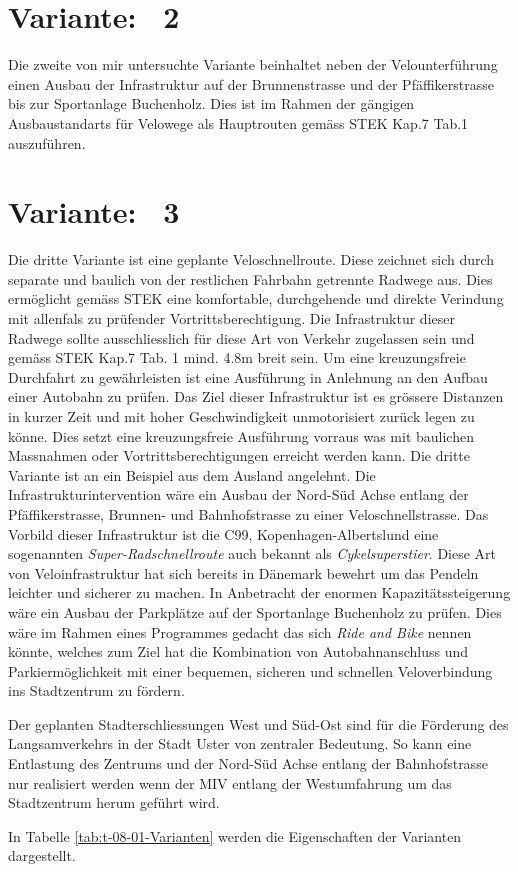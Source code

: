\section{Variante: \ 2}
\label{chap:V2}
	
Die zweite von mir untersuchte Variante beinhaltet neben der Velounterführung einen Ausbau der Infrastruktur auf der Brunnenstrasse und der Pfäffikerstrasse bis zur Sportanlage Buchenholz. Dies ist im Rahmen der gängigen Ausbaustandarts für Velowege als Hauptrouten gemäss STEK Kap.7 Tab.1 auszuführen.

\section{Variante: \ 3}
\label{chap:V3}

Die dritte Variante ist eine geplante Veloschnellroute. 
Diese zeichnet sich durch separate und baulich von der restlichen Fahrbahn getrennte Radwege aus. Dies ermöglicht gemäss STEK eine komfortable, durchgehende und direkte Verindung mit allenfals zu prüfender Vortrittsberechtigung. Die Infrastruktur dieser Radwege sollte ausschliesslich für diese Art von Verkehr zugelassen sein und gemäss STEK Kap.7 Tab. 1 mind. 4.8m breit sein. Um eine kreuzungsfreie Durchfahrt zu gewährleisten ist eine Ausführung in Anlehnung an den Aufbau einer Autobahn zu prüfen.  
Das Ziel dieser Infrastruktur ist es grössere Distanzen in kurzer Zeit und mit hoher Geschwindigkeit unmotorisiert zurück legen zu könne. Dies setzt eine kreuzungsfreie Ausführung vorraus was mit baulichen Massnahmen oder Vortrittsberechtigungen erreicht werden kann.
Die dritte Variante ist an ein Beispiel aus dem Ausland angelehnt. Die Infrastrukturintervention wäre ein Ausbau der Nord-Süd Achse entlang der Pfäffikerstrasse, Brunnen- und Bahnhofstrasse zu einer Veloschnellstrasse. 
Das Vorbild dieser Infrastruktur ist die C99, Kopenhagen-Albertslund eine sogenannten \textit{Super-Radschnellroute} auch bekannt als \textit{Cykelsuperstier}. Diese Art von Veloinfrastruktur hat sich bereits in Dänemark bewehrt um das Pendeln leichter und sicherer zu machen. 
In Anbetracht der enormen Kapazitätssteigerung wäre ein Ausbau der Parkplätze auf der Sportanlage Buchenholz zu prüfen. Dies wäre im Rahmen eines Programmes gedacht das sich \textit{Ride and Bike} nennen könnte, welches zum Ziel hat die Kombination von Autobahnanschluss und Parkiermöglichkeit mit einer bequemen, sicheren und schnellen Veloverbindung ins Stadtzentrum zu fördern. 

Der geplanten Stadterschliessungen West und Süd-Ost sind für die Förderung des Langsamverkehrs in der Stadt Uster von zentraler Bedeutung. So kann eine Entlastung des Zentrums und der Nord-Süd Achse entlang der Bahnhofstrasse nur realisiert werden wenn der MIV entlang der Westumfahrung um das Stadtzentrum herum geführt wird. 

In Tabelle \ref{tab:t-08-01-Varianten} werden die Eigenschaften der Varianten dargestellt.




%

